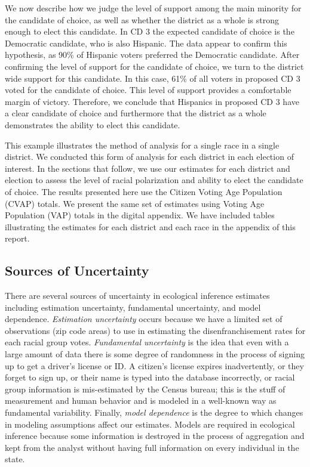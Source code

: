 \documentclass[12pt]{article}
\begin{document}
We now describe how we judge the level of support among the main
minority for the candidate of choice, as well as whether the district
as a whole is strong enough to elect this candidate. In CD 3 the
expected candidate of choice is the Democratic candidate, who is also
Hispanic. The data appear to confirm this hypothesis, as 90\% of
Hispanic voters preferred the Democratic candidate. After confirming
the level of support for the candidate of choice, we turn to the
district wide support for this candidate. In this case, 61\% of all
voters in proposed CD 3 voted for the candidate of choice. This level
of support provides a comfortable margin of victory. Therefore, we
conclude that Hispanics in proposed CD 3 have a clear candidate of
choice and furthermore that the district as a whole demonstrates the
ability to elect this candidate.

This example illustrates the method of analysis for a single race in a
single district. We conducted this form of analysis for each district
in each election of interest. In the sections that follow, we use our
estimates for each district and election to assess the level of racial
polarization and ability to elect the candidate of choice.  The
results presented here use the Citizen Voting Age Population (CVAP)
totals. We present the same set of estimates using Voting Age
Population (VAP) totals in the digital appendix.  We have included
tables illustrating the estimates for each district and each race in
the appendix of this report.

\subsection{Sources of Uncertainty}

There are several sources of uncertainty in ecological inference
estimates including estimation uncertainty, fundamental uncertainty,
and model dependence.  \emph{Estimation uncertainty} occurs because we
have a limited set of observations (zip code areas) to use in
estimating the disenfranchisement rates for each racial group votes.
\emph{Fundamental uncertainty} is the idea that even with a large
amount of data there is some degree of randomness in the process of
signing up to get a driver's license or ID.  A citizen's license
expires inadvertently, or they forget to sign up, or their name is
typed into the database incorrectly, or racial group information is
mis-estimated by the Census bureau; this is the stuff of measurement
and human behavior and is modeled in a well-known way as fundamental
variability.  Finally, \emph{model dependence} is the degree to which
changes in modeling assumptions affect our estimates.  Models are
required in ecological inference because some information is destroyed
in the process of aggregation and kept from the analyst without having
full information on every individual in the state.
\end{document}
